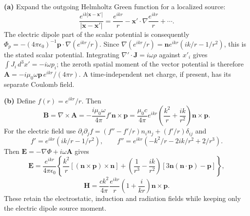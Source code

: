 \textbf{(a)} Expand the outgoing Helmholtz Green function for a localized
source:
\[
\frac{e^{ik|\mathbf x-\mathbf x'|}}{|\mathbf x-\mathbf x'|}
=\frac{e^{ikr}}r-\mathbf x'\cdot\nabla\frac{e^{ikr}}r+\cdots.
\]
The electric dipole part of the scalar potential is consequently
$\Phi_p=-(4\pi\epsilon_0)^{-1}\mathbf p\cdot\nabla(e^{ikr}/r)$.
Since $\nabla(e^{ikr}/r)=\mathbf n e^{ikr}(ik/r-1/r^2)$, this is the
stated scalar potential. Integrating
$\nabla'\cdot\mathbf J=i\omega\rho$ against $x'_i$ gives
$\int J_i\,d^3x'=-i\omega p_i$; the zeroth spatial moment of the vector
potential is therefore
$\mathbf A=-i\mu_0\omega\mathbf p\,e^{ikr}/(4\pi r)$.
A time-independent net charge, if present, has its separate Coulomb field.

\textbf{(b)} Define $f(r)=e^{ikr}/r$. Then
\[
\mathbf B=\nabla\times\mathbf A
=-\frac{i\mu_0\omega}{4\pi}f'\mathbf n\times\mathbf p
=\frac{\mu_0c}{4\pi}e^{ikr}
\left(\frac{k^2}{r}+\frac{ik}{r^2}\right)\mathbf n\times\mathbf p.
\]
For the electric field use
$\partial_i\partial_j f=(f''-f'/r)n_in_j+(f'/r)\delta_{ij}$ and
\[
f'=e^{ikr}(ik/r-1/r^2),\qquad
f''=e^{ikr}(-k^2/r-2ik/r^2+2/r^3).
\]
Then $\mathbf E=-\nabla\Phi+i\omega\mathbf A$ gives
\[
\boxed{\mathbf E=\frac{e^{ikr}}{4\pi\epsilon_0}
\left\{\frac{k^2}{r}[(\mathbf n\times\mathbf p)\times\mathbf n]
+\left(\frac1{r^3}-\frac{ik}{r^2}\right)
[3\mathbf n(\mathbf n\cdot\mathbf p)-\mathbf p]\right\},}
\]
\[
\boxed{\mathbf H=\frac{ck^2}{4\pi}\frac{e^{ikr}}r
\left(1+\frac{i}{kr}\right)\mathbf n\times\mathbf p.}
\]
These retain the electrostatic, induction and radiation fields while
keeping only the electric dipole source moment.

